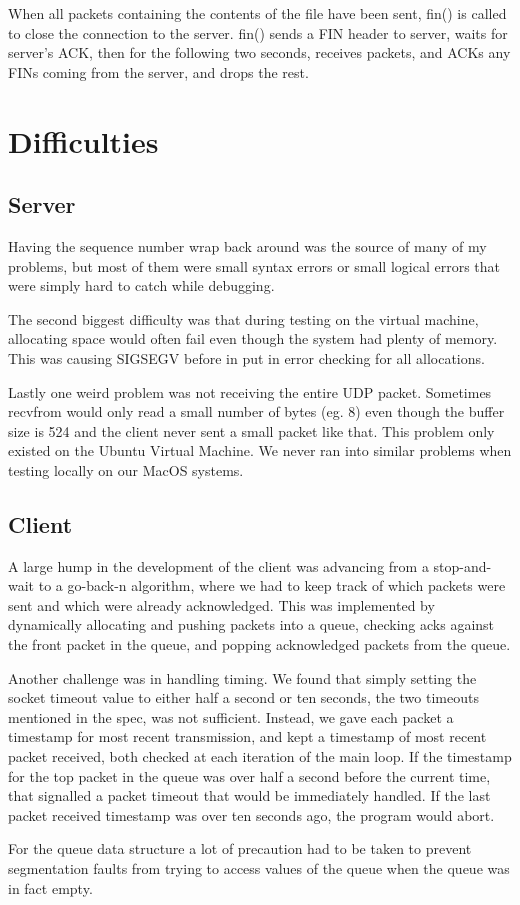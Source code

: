 \documentclass[12pt]{article}
\begin{document}
When all packets containing the contents of the file have been sent, fin() is called to close the connection to the server. fin() sends a FIN header to server, waits for server's ACK, then for the following two seconds, receives packets, and ACKs any FINs coming from the server, and drops the rest. 

\section{Difficulties}
\subsection{Server}
Having the sequence number wrap back around was the source of many of my problems, but most of them were small syntax errors or small logical errors that were simply hard to catch while debugging.

The second biggest difficulty was that during testing on the virtual machine, allocating space would often fail even though the system had plenty of memory. This was causing SIGSEGV before in put in error checking for all allocations.

Lastly one weird problem was not receiving the entire UDP packet. Sometimes recvfrom would only read a small number of bytes (eg. 8) even though the buffer size is 524 and the client never sent a small packet like that. This problem only existed on the Ubuntu Virtual Machine. We never ran into similar problems when testing locally on our MacOS systems.

\subsection{Client}
A large hump in the development of the client was advancing from a stop-and-wait to a go-back-n algorithm, where we had to keep track of which packets were sent and which were already acknowledged. This was implemented by dynamically allocating and pushing packets into a queue, checking acks against the front packet in the queue, and popping acknowledged packets from the queue.

Another challenge was in handling timing. We found that simply setting the socket timeout value to either half a second or ten seconds, the two timeouts mentioned in the spec, was not sufficient. Instead, we gave each packet a timestamp for most recent transmission, and kept a timestamp of most recent packet received, both checked at each iteration of the main loop. If the timestamp for the top packet in the queue was over half a second before the current time, that signalled a packet timeout that would be immediately handled. If the last packet received timestamp was over ten seconds ago, the program would abort.

For the queue data structure a lot of precaution had to be taken to prevent segmentation faults from trying to access values of the queue when the queue was in fact empty.
\end{document}
